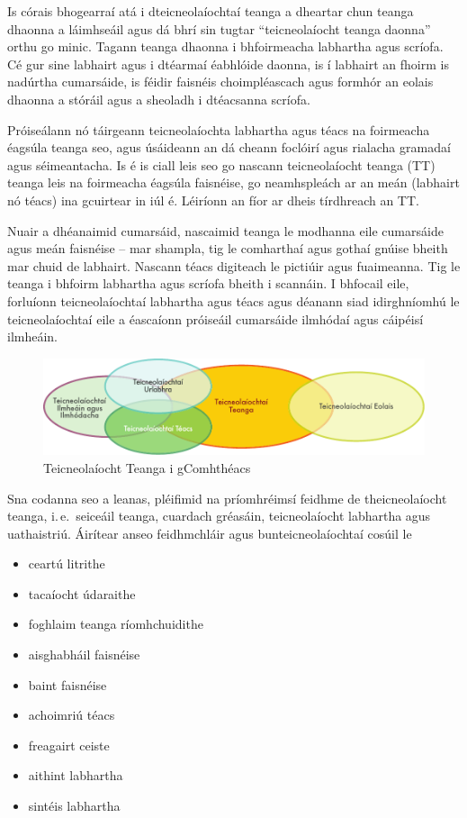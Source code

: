 \begin{multicols}{2}

Is córais bhogearraí atá i dteicneolaíochtaí teanga a dheartar chun teanga dhaonna a láimhseáil agus dá bhrí sin tugtar ``teicneolaíocht teanga daonna'' orthu go minic. Tagann teanga dhaonna i bhfoirmeacha labhartha agus scríofa. Cé gur sine labhairt agus i dtéarmaí éabhlóide daonna, is í labhairt an fhoirm is nadúrtha cumarsáide, is féidir faisnéis choimpléascach agus formhór an eolais dhaonna a stóráil agus a sheoladh i dtéacsanna scríofa. 

Próiseálann nó táirgeann teicneolaíochta labhartha agus téacs na foirmeacha éagsúla teanga seo,  agus úsáideann an dá cheann foclóirí agus rialacha gramadaí agus séimeantacha. Is é is ciall leis seo go nascann teicneolaíocht teanga (TT) teanga leis na foirmeacha éagsúla faisnéise, go neamhspleách ar an meán (labhairt nó téacs) ina gcuirtear in iúl é. Léiríonn an fíor ar dheis tírdhreach an TT.

Nuair a dhéanaimid cumarsáid, nascaimid teanga le modhanna eile cumarsáide agus meán faisnéise – mar shampla, tig le comharthaí agus gothaí gnúise bheith mar chuid de labhairt. Nascann téacs digiteach le pictiúir agus fuaimeanna. Tig le teanga i bhfoirm labhartha agus scríofa bheith i scannáin. I bhfocail eile, forluíonn teicneolaíochtaí labhartha agus téacs agus déanann siad idirghníomhú le teicneolaíochtaí eile a éascaíonn próiseáil cumarsáide ilmhódaí agus cáipéisí ilmheáin. 

\begin{figure}[htb]
  \center
  \includegraphics[width=\textwidth]{../_media/irish/language_technologies}
  \caption{Teicneolaíocht Teanga i gComhthéacs}
  \label{fig:ltincontext_de}
\end{figure}

Sna codanna seo a leanas, pléifimid na príomhréimsí feidhme de theicneolaíocht teanga, i.\,e.~seiceáil teanga, cuardach gréasáin, teicneolaíocht labhartha agus uathaistriú. Áirítear anseo feidhmchláir agus bunteicneolaíochtaí cosúil le

\begin{itemize}
\item ceartú litrithe
\item tacaíocht údaraithe
\item foghlaim teanga ríomhchuidithe
\item aisghabháil faisnéise
\item baint faisnéise
\item achoimriú téacs
\item freagairt ceiste
\item aithint labhartha 
\item sintéis labhartha
\end{itemize}


\end{multicols}
